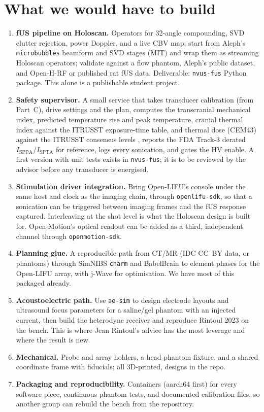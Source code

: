 \documentclass[11pt,a4paper]{article}
\begin{document}
\section{What we would have to build}

\begin{enumerate}[leftmargin=*]
\item \textbf{fUS pipeline on Holoscan.} Operators for 32-angle compounding, SVD clutter rejection, power Doppler, and a live CBV map; start from Aleph's \texttt{microbubbles} beamform and SVD stages (MIT) and wrap them as streaming Holoscan operators; validate against a flow phantom, Aleph's public dataset, and Open-H-RF or published rat fUS data. Deliverable: \texttt{nvus-fus} Python package. This alone is a publishable student project.
\item \textbf{Safety supervisor.} A small service that takes transducer calibration (from Part~C), drive settings and the plan, computes the transcranial mechanical index, predicted temperature rise and peak temperature, cranial thermal index against the ITRUSST exposure-time table, and thermal dose (CEM43) against the ITRUSST consensus levels \cite{itrusst}, reports the FDA Track-3 derated $I_{\mathrm{SPPA}}$/$I_{\mathrm{SPTA}}$ for reference, logs every sonication, and gates the HV enable. A first version with unit tests exists in \texttt{nvus-fus}; it is to be reviewed by the advisor before any transducer is energised.
\item \textbf{Stimulation driver integration.} Bring Open-LIFU's console under the same host and clock as the imaging chain, through \texttt{openlifu-sdk}, so that a sonication can be triggered between imaging frames and the fUS response captured. Interleaving at the shot level is what the Holoscan design is built for. Open-Motion's optical readout can be added as a third, independent channel through \texttt{openmotion-sdk}.
\item \textbf{Planning glue.} A reproducible path from CT/MR (IDC CC~BY data, or phantoms) through SimNIBS \texttt{charm} and BabelBrain to element phases for the Open-LIFU array, with j-Wave for optimisation. We have most of this packaged already.
\item \textbf{Acoustoelectric path.} Use \texttt{ae-sim} to design electrode layouts and ultrasound focus parameters for a saline/gel phantom with an injected current, then build the heterodyne receiver and reproduce Rintoul 2023 on the bench. This is where Jean Rintoul's advice has the most leverage and where the result is new.
\item \textbf{Mechanical.} Probe and array holders, a head phantom fixture, and a shared coordinate frame with fiducials; all 3D-printed, designs in the repo.
\item \textbf{Packaging and reproducibility.} Containers (aarch64 first) for every software piece, continuous phantom tests, and documented calibration files, so another group can rebuild the bench from the repository.
\end{enumerate}
\end{document}
